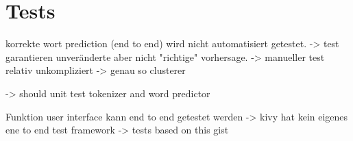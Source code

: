 \section{Tests}
	korrekte wort prediction (end to end) wird nicht automatisiert getestet. 
    -> test garantieren unveränderte aber nicht "richtige" vorhersage.
    -> manueller test relativ unkompliziert
    -> genau so clusterer
    
    -> should unit test tokenizer and word predictor
    
    Funktion user interface kann end to end getestet werden
    -> kivy hat kein eigenes ene to end test framework
    -> tests based on this gist
    \newpage
       